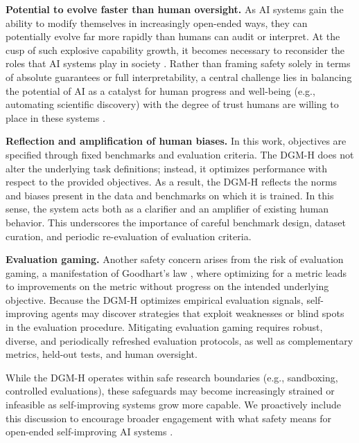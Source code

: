 \textbf{Potential to evolve faster than human oversight.}
As AI systems gain the ability to modify themselves in increasingly open-ended ways, they can potentially evolve far more rapidly than humans can audit or interpret. At the cusp of such explosive capability growth, it becomes necessary to reconsider the roles that AI systems play in society \citep{bengio2024managing}. Rather than framing safety solely in terms of absolute guarantees or full interpretability, a central challenge lies in balancing the potential of AI as a catalyst for human progress and well-being (e.g., automating scientific discovery) with the degree of trust humans are willing to place in these systems \citep{clune2019ai, ecoffet2020open, bengio2024managing, weston2025ai}.

\textbf{Reflection and amplification of human biases.}
In this work, objectives are specified through fixed benchmarks and evaluation criteria. The DGM-H does not alter the underlying task definitions; instead, it optimizes performance with respect to the provided objectives. As a result, the DGM-H reflects the norms and biases present in the data and benchmarks on which it is trained. In this sense, the system acts both as a clarifier and an amplifier of existing human behavior. This underscores the importance of careful benchmark design, dataset curation, and periodic re-evaluation of evaluation criteria.

\textbf{Evaluation gaming.}
Another safety concern arises from the risk of evaluation gaming, a manifestation of Goodhart's law \citep{strathern1997improving}, where optimizing for a metric leads to improvements on the metric without progress on the intended underlying objective. Because the DGM-H optimizes empirical evaluation signals, self-improving agents may discover strategies that exploit weaknesses or blind spots in the evaluation procedure. Mitigating evaluation gaming requires robust, diverse, and periodically refreshed evaluation protocols, as well as complementary metrics, held-out tests, and human oversight.

While the DGM-H operates within safe research boundaries (e.g., sandboxing, controlled evaluations), these safeguards may become increasingly strained or infeasible as self-improving systems grow more capable. We proactively include this discussion to encourage broader engagement with what safety means for open-ended self-improving AI systems \citep{clune2019ai, ecoffet2020open, sheth2025safety}.
